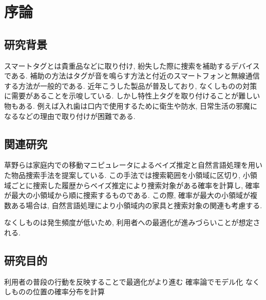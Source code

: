 \chapter{序論}

\section{研究背景}
スマートタグとは貴重品などに取り付け, 紛失した際に捜索を補助するデバイスである. 
補助の方法はタグが音を鳴らす方法と付近のスマートフォンと無線通信する方法が一般的である. 
近年こうした製品が普及しており, なくしものの対策に需要があることを示唆している. 
しかし特性上タグを取り付けることが難しい物もある. 
例えば入れ歯は口内で使用するために衛生や防水, 日常生活の邪魔になるなどの理由で取り付けが困難である. 

\section{関連研究}
草野らは家庭内での移動マニピュレータによるベイズ推定と自然言語処理を用いた物品捜索手法を提案している. \cite{kusano}
この手法では捜索範囲を小領域に区切り, 小領域ごとに捜索した履歴からベイズ推定により捜索対象がある確率を計算し, 確率が最大の小領域から順に捜索するものである. 
この際, 確率が最大の小領域が複数ある場合は, 自然言語処理により小領域内の家具と捜索対象の関連も考慮する. 

なくしものは発生頻度が低いため, 利用者への最適化が進みづらいことが想定される. 

\section{研究目的}
利用者の普段の行動を反映することで最適化がより進む
確率論でモデル化
なくしものの位置の確率分布を計算



%
